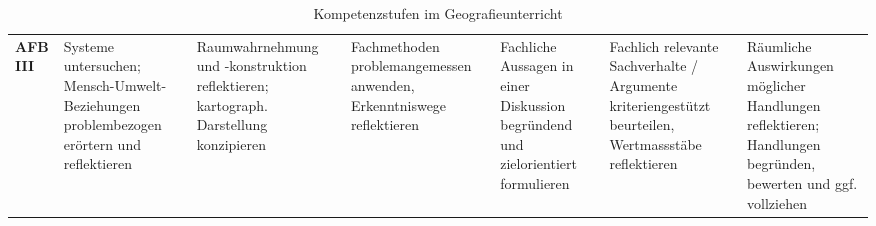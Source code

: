 \begin{landscape}
\begin{table}[H]
\begin{tabular}{>{\bfseries}p{2.5cm} | p{3cm} p{3cm} p{3cm} p{3cm} p{3cm} p{3cm}}
      AFB III                                                                                              &
      Systeme untersuchen; Mensch-Umwelt-Beziehungen problembezogen erörtern und reflektieren              &
      Raumwahrnehmung und -konstruktion reflektieren; kartograph. Darstellung konzipieren                  &
      Fachmethoden problemangemessen anwenden, Erkenntniswege reflektieren                                 &
      Fachliche Aussagen in einer Diskussion begründend und zielorientiert formulieren                     &
      Fachlich relevante Sachverhalte / Argumente kriteriengestützt beurteilen, Wertmassstäbe reflektieren &
      Räumliche Auswirkungen möglicher Handlungen reflektieren; Handlungen begründen, bewerten und ggf. vollziehen                                                                                                                                                                           \\
    \end{tabular}
    \caption{Kompetenzstufen im Geografieunterricht}
  \end{table}
\end{landscape}

